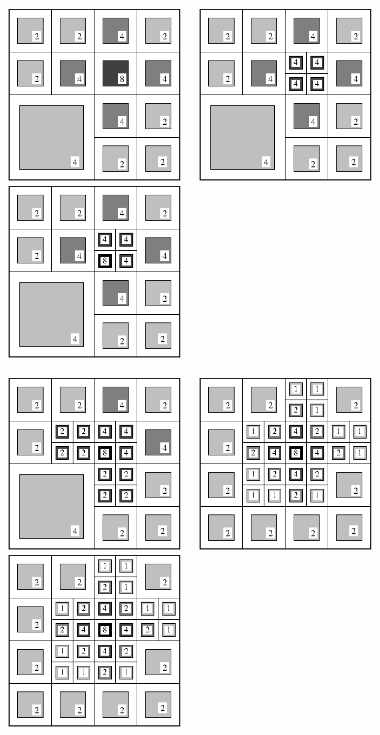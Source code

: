 \centerline{\includegraphics[width=1.8in]{amr2-7.eps} \ \
            \includegraphics[width=1.8in]{amr2-8.eps} \ \
            \includegraphics[width=1.8in]{amr2-9.eps}}

\centerline{\includegraphics[width=1.8in]{amr2-10.eps} \ \
            \includegraphics[width=1.8in]{amr2-11.eps} \ \
            \includegraphics[width=1.8in]{amr2-11.eps}}
